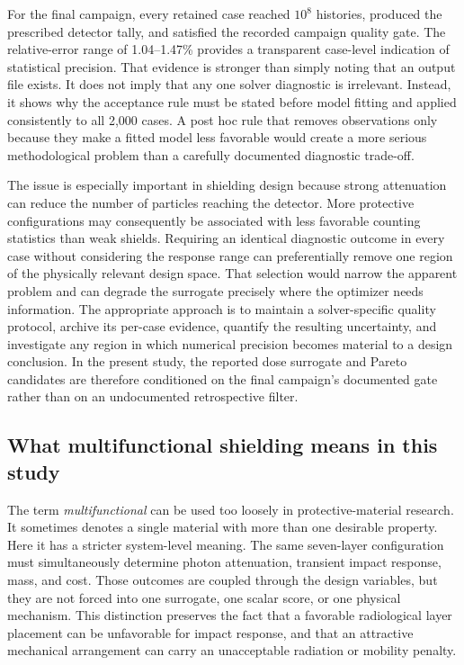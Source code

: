 \documentclass[12pt]{elsarticle}
\begin{document}
	For the final campaign, every retained case reached $10^8$ histories, produced the prescribed detector tally, and satisfied the recorded campaign quality gate. The relative-error range of 1.04--1.47\% provides a transparent case-level indication of statistical precision. That evidence is stronger than simply noting that an output file exists. It does not imply that any one solver diagnostic is irrelevant. Instead, it shows why the acceptance rule must be stated before model fitting and applied consistently to all 2,000 cases. A post hoc rule that removes observations only because they make a fitted model less favorable would create a more serious methodological problem than a carefully documented diagnostic trade-off.

	The issue is especially important in shielding design because strong attenuation can reduce the number of particles reaching the detector. More protective configurations may consequently be associated with less favorable counting statistics than weak shields. Requiring an identical diagnostic outcome in every case without considering the response range can preferentially remove one region of the physically relevant design space. That selection would narrow the apparent problem and can degrade the surrogate precisely where the optimizer needs information. The appropriate approach is to maintain a solver-specific quality protocol, archive its per-case evidence, quantify the resulting uncertainty, and investigate any region in which numerical precision becomes material to a design conclusion. In the present study, the reported dose surrogate and Pareto candidates are therefore conditioned on the final campaign's documented gate rather than on an undocumented retrospective filter.

	\subsection{What multifunctional shielding means in this study}

	The term \emph{multifunctional} can be used too loosely in protective-material research. It sometimes denotes a single material with more than one desirable property. Here it has a stricter system-level meaning. The same seven-layer configuration must simultaneously determine photon attenuation, transient impact response, mass, and cost. Those outcomes are coupled through the design variables, but they are not forced into one surrogate, one scalar score, or one physical mechanism. This distinction preserves the fact that a favorable radiological layer placement can be unfavorable for impact response, and that an attractive mechanical arrangement can carry an unacceptable radiation or mobility penalty.
\end{document}
